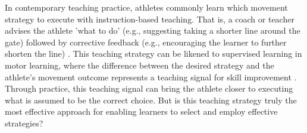 \documentclass[pdflatex,sn-nature]{sn-jnl}%
\theoremstyle{thmstyleone}%
\theoremstyle{thmstyletwo}%
\theoremstyle{thmstylethree}%
\begin{document}

In contemporary teaching practice, athletes commonly learn which movement strategy to execute with instruction-based teaching. That is, a coach or teacher advises the athlete 'what to do' (e.g., suggesting taking a shorter line around the gate) followed by corrective feedback (e.g., encouraging the learner to further shorten the line) \cite{williams_practice_2005, williams_effective_2023, hodges_modelling_2002}. This teaching strategy can be likened to supervised learning in motor learning, where the difference between the desired strategy and the athlete's movement outcome represents a teaching signal for skill improvement  \cite{jordan_forward_1992, wolpert_motor_2010, doya_complementary_2000}. Through practice, this teaching signal can bring the athlete closer to executing what is assumed to be the correct choice. But is this teaching strategy truly the most effective approach for enabling learners to select and employ effective strategies? 
\end{document}
